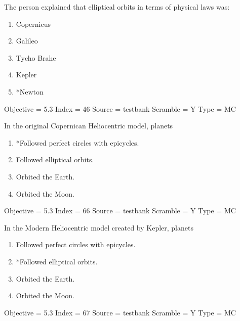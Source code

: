 \documentclass[11pt]{article}
\begin{document}
\begin{enumerate}
\begin{minipage}{\textwidth}
\begin{minipage}{\textwidth}
\item The person explained that elliptical orbits in terms of physical laws was:
\begin{multicols}{3}
\begin{enumerate} 
\setlength{\itemsep}{1pt} 
\setlength{\parskip}{0pt} 
\setlength{\parsep}{0pt}
\setlength{\multicolsep}{1pt} 
\item Copernicus
\item Galileo
\item Tycho Brahe
\item Kepler
\item *Newton
\end{enumerate} 
\vfill 
\end{multicols}

Objective = 5.3
Index = 46
Source = testbank
Scramble = Y
Type = MC
\end{minipage}
\end{minipage}
\vskip 0.20in

\begin{minipage}{\textwidth}
\begin{minipage}{\textwidth}
\item In the original Copernican Heliocentric model, planets
\begin{enumerate} 
\setlength{\itemsep}{1pt} 
\setlength{\parskip}{0pt} 
\setlength{\parsep}{0pt}
\setlength{\multicolsep}{1pt} 
\item *Followed perfect circles with epicycles.
\item Followed elliptical orbits.
\item Orbited the Earth.
\item Orbited the Moon.
\end{enumerate} 
Objective = 5.3
Index = 66
Source = testbank
Scramble = Y
Type = MC
\end{minipage}
\end{minipage}
\vskip 0.20in

\begin{minipage}{\textwidth}
\begin{minipage}{\textwidth}
\item In the Modern Heliocentric model created by Kepler, planets
\begin{enumerate} 
\setlength{\itemsep}{1pt} 
\setlength{\parskip}{0pt} 
\setlength{\parsep}{0pt}
\setlength{\multicolsep}{1pt} 
\item Followed perfect circles with epicycles.
\item *Followed elliptical orbits.
\item Orbited the Earth.
\item Orbited the Moon.
\end{enumerate} 
Objective = 5.3
Index = 67
Source = testbank
Scramble = Y
Type = MC
\end{minipage}
\end{minipage}
\vskip 0.20in


\end{enumerate}
\end{document}
